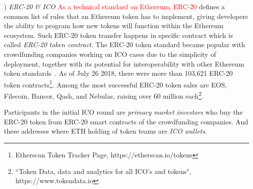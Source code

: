 





) \emph{ERC-20 \& ICO}
\textcolor{red}{As a technical standard on Ethereum, ERC-20} defines a common list of rules that an Ethereum token has to implement, giving developers the ability to program how new tokens will function within the Ethereum ecosystem. Such ERC-20 token transfer happens in specific contract which is called \emph{ERC-20 token contract}. The ERC-20 token standard became popular with crowdfunding companies working on ICO cases due to the simplicity of deployment, together with its potential for interoperability with other Ethereum token standards~\cite{erc-20}. As of July 26 2018, there were more than 103,621 ERC-20 token contracts\footnote{Etherscan Token Tracker Page, https://etherscan.io/tokens}. Among the most successful ERC-20 token sales are EOS, Filecoin, Bancor, Qash, and Nebulas, raising over 60 million each\footnote{``Token Data, data and analytics for all ICO's and tokens", https://www.tokendata.io}.

Participants in the initial ICO round are \emph{primary market investors} who buy the ERC-20 token from ERC-20 smart contracts of the crowdfunding companies. And these addresses where ETH holding of token teams are \emph{ICO wallets}.

